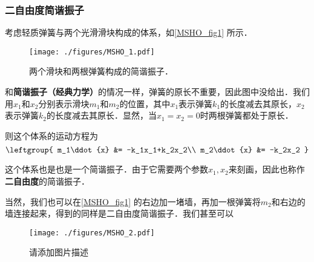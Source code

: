 

\subsubsection{二自由度简谐振子}

考虑轻质弹簧与两个光滑滑块构成的体系，如\autoref{MSHO_fig1} 所示．

\begin{figure}[ht]
\centering
\texttt{[image: ./figures/MSHO\_1.pdf]}
\caption{两个滑块和两根弹簧构成的简谐振子．} \label{MSHO_fig1}
\end{figure}

和\textbf{简谐振子（经典力学）}的情况一样，弹簧的原长不重要，因此图中没给出．我们用$x_1$和$x_2$分别表示滑块$m_1$和$m_2$的位置，其中$x_1$表示弹簧$k_1$的长度减去其原长，$x_2$表示弹簧$k_2$的长度减去其原长．显然，当$x_1=x_2=0$时两根弹簧都处于原长．

则这个体系的运动方程为
\begin{equation}
\leftgroup{
    m_1\ddot{x} &= -k_1x_1+k_2x_2\\
    m_2\ddot{x} &= -k_2x_2
}
\end{equation}

这个体系也是也是一个简谐振子．由于它需要两个参数$x_1, x_2$来刻画，因此也称作\textbf{二自由度}的简谐振子．

当然，我们也可以在\autoref{MSHO_fig1} 的右边加一堵墙，再加一根弹簧将$m_2$和右边的墙连接起来，得到的同样是二自由度简谐振子．我们甚至可以


\begin{figure}[ht]
\centering
\texttt{[image: ./figures/MSHO\_2.pdf]}
\caption{请添加图片描述} \label{MSHO_fig2}
\end{figure}










